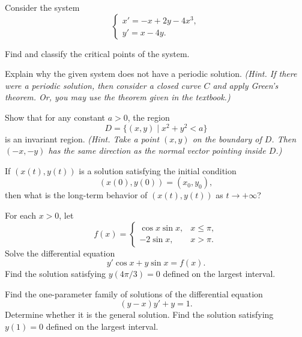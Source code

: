 \begin{problem}
Consider the system
\[
\begin{cases}
x'=-x+2y-4x^3,\\
y'=x-4y.
\end{cases}
\]
\begin{problemsubparts}
\item Find and classify the critical points of the system.
\item Explain why the given system does not have a periodic solution. \textit{(Hint. If there were a periodic solution, then consider a closed curve $C$ and apply Green's theorem. Or, you may use the theorem given in the textbook.)}
\item Show that for any constant $a>0$, the region
\[
D=\{(x,y)\mid x^2+y^2<a\}
\]
is an invariant region. \textit{(Hint. Take a point $(x,y)$ on the boundary of $D$. Then $(-x,-y)$ has the same direction as the normal vector pointing inside $D$.)}
\item If $(x(t),y(t))$ is a solution satisfying the initial condition
\[
(x(0),y(0))=(x_0,y_0),
\]
then what is the long-term behavior of $(x(t),y(t))$ as $t\to+\infty$?
\end{problemsubparts}
\end{problem}

\begin{problem}
For each $x>0$, let
\[
f(x)=
\begin{cases}
\cos x\sin x, & x\le\pi,\\
-2\sin x, & x>\pi.
\end{cases}
\]
Solve the differential equation
\[
y'\cos x+y\sin x=f(x).
\]
Find the solution satisfying $y(4\pi/3)=0$ defined on the largest interval.
\end{problem}

\begin{problem}
Find the one-parameter family of solutions of the differential equation
\[
(y-x)y'+y=1.
\]
Determine whether it is the general solution. Find the solution satisfying $y(1)=0$ defined on the largest interval.
\end{problem}

